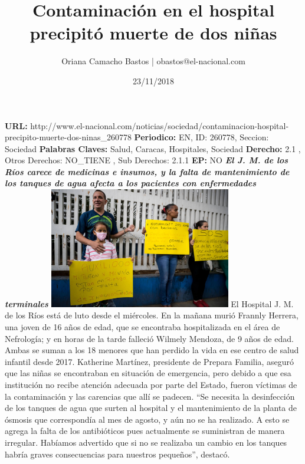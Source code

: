 \documentclass{article}%
\title{\textbf{Contaminación en el hospital precipitó muerte de dos niñas}}%
\author{Oriana Camacho Bastos | obastos@el{-}nacional.com}%
\date{23/11/2018}%
\begin{document}
%
\normalsize%
\maketitle%
\textbf{URL: }%
http://www.el{-}nacional.com/noticias/sociedad/contaminacion{-}hospital{-}precipito{-}muerte{-}dos{-}ninas\_260778\newline%
%
\textbf{Periodico: }%
EN, %
ID: %
260778, %
Seccion: %
Sociedad\newline%
%
\textbf{Palabras Claves: }%
Salud, Caracas, Hospitales, Sociedad\newline%
%
\textbf{Derecho: }%
2.1%
, Otros Derechos: %
NO\_TIENE%
, Sub Derechos: %
2.1.1%
\newline%
%
\textbf{EP: }%
NO\newline%
\newline%
%
\textbf{\textit{El J. M. de los Ríos carece de medicinas e insumos, y la falta de mantenimiento de los tanques de agua afecta a los pacientes con enfermedades terminales}}%
\newline%
\newline%
%
\includegraphics[width=300px]{133.jpg}%
\newline%
%
El Hospital J. M. de los Ríos está de luto desde el miércoles. En la mañana murió Frannly Herrera, una joven de 16 años de edad, que se encontraba hospitalizada en el área de Nefrología; y en horas de la tarde falleció Wilmely Mendoza, de 9 años de edad. Ambas se suman a los 18 menores que han perdido la vida en ese centro de salud infantil desde 2017. Katherine Martínez, presidente de Prepara Familia, aseguró que las niñas se encontraban en situación de emergencia, pero debido a que esa institución no recibe atención adecuada por parte del Estado, fueron víctimas de la contaminación y las carencias que allí se padecen.%
\newline%
%
“Se necesita la desinfección de los tanques de agua que surten al hospital y el mantenimiento de la planta de ósmosis que correspondía al mes de agosto, y aún no se ha realizado. A esto se agrega la falta de los antibióticos pues actualmente se suministran de manera irregular. Habíamos advertido que si no se realizaba un cambio en los tanques habría graves consecuencias para nuestros pequeños”, destacó.%
\end{document}
